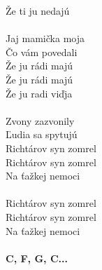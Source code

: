 Že ti ju nedajú\\
\\
Jaj mamička moja\\
Čo vám povedali\\
Že ju rádi majú\\
Že ju rádi majú\\
Že ju radi viďja\\
\\
Zvony zazvonily\\
Ľudia sa spytujú\\
Richtárov syn zomrel\\
Richtárov syn zomrel\\
Na ťažkej nemoci\\
\\
Richtárov syn zomrel\\
Richtárov syn zomrel\\
Na ťažkej nemoci\\
\\
\footnotesize\textbf{C, F, G, C...}\\
\\
\normalsize
